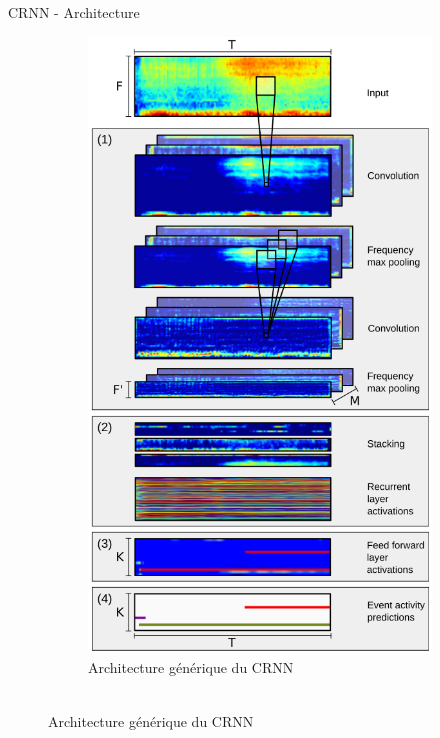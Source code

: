 \documentclass[compress,xcolor=table]{beamer}
\begin{document}
\begin{frame}{CRNN - Architecture}

    \begin{figure}[ht]
        \centering
        \begin{subfigure}[b]{0.45\textwidth}
            \centering
            \includegraphics[width=\textwidth,height=0.8\textheight,keepaspectratio]{images/models/CRNN.architecture.generic.pdf}
            \caption{Architecture générique du CRNN\\~}

\end{subfigure}
\end{figure}
\end{frame}
\end{document}
